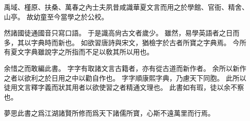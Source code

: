 禹域、槿原、扶桑、萬春之內士夫夙昔咸識華夏文言而用之於學館、官衙、精舍、山亭。
故幼童至今當學之於公校。

然諸國徒通國音只寫口語。
于是識高尙古文者歲少。
雖然，易學英語者之日而多，其以字典時而新也。
如欲習唐詩與宋文，猶檢字於古者所寶之字典焉。
今所有夏文字典雖說字之所指而不足以敎其所以用也。

余惜之而敢編此書。
字字有取諸文言古籍者，亦有從古道而新作者。
余所以新作之者以欲利之於日用之中以勸自作也。
字字順康熙字典，乃慮天下同胞。
此所以徒用文言釋字義而狀其用者以欲使習之者精通文理也。
此書如有瑕，徒以余不察也。

夢思此書之爲江湖諸賢所修而爲天下諸儒所寶，心斯不遠萬里而行焉。
